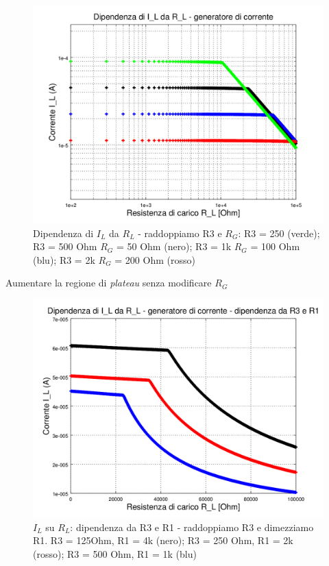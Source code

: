 \documentclass{beamer}
\begin{document}
\begin{frame}

{
\centering

\begin{figure}
\centering
\includegraphics[width=0.7\linewidth]{./corrente_carico_res_carico_R3_500-1k-2k-250_loglog}
\caption{Dipendenza di $I_L$ da $R_L$ - raddoppiamo R3 e $R_G$: R3 = 250 (verde); R3 = 500 Ohm $R_G$ = 50 Ohm (nero); R3 = 1k $R_G$ = 100 Ohm (blu); R3 = 2k $R_G$ = 200 Ohm (rosso)}
\label{fig:corrente_carico_res_carico_R3_500-1k-2k-250_loglog}
\end{figure}



}
\end{frame}



\begin{frame}{Aumentare la regione di \textit{plateau} senza modificare $R_G$}

{
\centering

\begin{figure}
\centering
\includegraphics[width=0.7\linewidth]{./corrente_carico_res_carico_R3_125-250-500_R1-4k-2k-1k_linear1}
\caption{$I_L$ su $R_L$: dipendenza da R3 e R1 - raddoppiamo R3 e dimezziamo R1. R3 = 125Ohm, R1 = 4k (nero); R3 = 250 Ohm, R1 = 2k (rosso); R3 = 500 Ohm, R1 = 1k (blu)}
\label{fig:corrente_carico_res_carico_R3_125-250-500_R1-4k-2k-1k_linear1}
\end{figure}


}
\end{frame}
\end{document}
